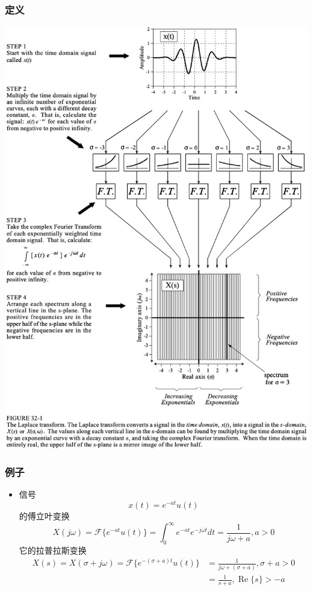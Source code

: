 \documentclass[CJKutf8,dvipsnames,table]{beamer}
\begin{document}
\begin{CJK*}{UTF8}{song}
  \begin{frame}
    \frametitle{定义}
    \begin{center}
      \includegraphics[scale=.227]{segdsp-f32-1}
    \end{center}
  \end{frame}       
      
  \begin{frame}
    \frametitle{例子}
    \begin{itemize}
    \item 信号
    \[
    	x(t) = e^{-at}u(t)
    \]
    的傅立叶变换
    \[
    	X(j\omega) = \mathscr{F}\{e^{-at} u(t)\} = \int_{0}^{\infty} e^{-at} e^{-j\omega t} dt = \frac{1}{j\omega + a}, a > 0
    \]
    它的拉普拉斯变换
    \begin{align*}
    	X(s) = X(\sigma + j\omega) = \mathscr{F}\{e^{-(\sigma + a)t} u(t)\} & = \frac{1}{j\omega + (\sigma + a)}, \sigma+a>0 \\
	        & = \frac{1}{s+a}, \operatorname{Re}\{s\} > -a       
    \end{align*}
    \end{itemize}
  \end{frame} 
  

\end{CJK*}
\end{document}
